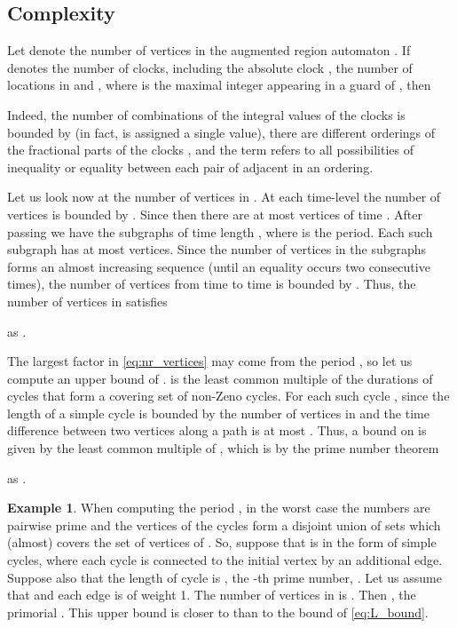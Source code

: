 \documentclass[11pt]{amsart}
\theoremstyle{definition}
\newtheorem{example}[theorem]{Example}
\begin{document}
\subsection{Complexity}
Let  denote the number of vertices in the augmented region automaton .
If  denotes the number of clocks, including the absolute clock ,  the number of locations in  and , where  is the maximal integer appearing in a guard of , then

Indeed, the number of combinations of the integral values of the clocks is bounded by  (in fact,  is assigned a single value), there are  different orderings of the fractional parts of the clocks , and the term  refers to all possibilities of inequality or equality between each pair of adjacent  in an ordering.

Let us look now at the number of vertices in .
At each time-level the number of vertices is bounded by .
Since  then there are at most  vertices of time .
After passing  we have the subgraphs  of time length , where  is the period.
Each such subgraph has at most  vertices.
Since the number of vertices in the subgraphs forms an almost increasing sequence (until an equality occurs two consecutive times), the number of vertices from time  to time  is bounded by . 
Thus, the number  of vertices in  satisfies

as .

The largest factor in \eqref{eq:nr_vertices} may come from the period , so let us compute an upper bound of .
 is the least common multiple of the durations  of cycles that form a covering set of non-Zeno cycles.
For each such cycle ,  since  the length of a simple cycle is bounded by the number  of vertices in  and the time difference between two vertices along a path is at most .
Thus, a bound on  is given by the least common multiple of , which is by the prime number theorem

as .

\begin{example}
	When computing the period , in the worst case the numbers  are pairwise prime and the vertices of the cycles  form a disjoint union of sets which (almost) covers the set of vertices of .
	So, suppose that  is in the form of  simple cycles, where each cycle is connected to the initial vertex by an additional edge.
	Suppose also that the length of cycle  is , the -th prime number, .
	Let us assume that  and each edge is of weight 1.
	The number of vertices in  is .
Then , the primorial .
	This upper bound is closer to  than to the bound  of \eqref{eq:L_bound}. 
\end{example}
\end{document}
